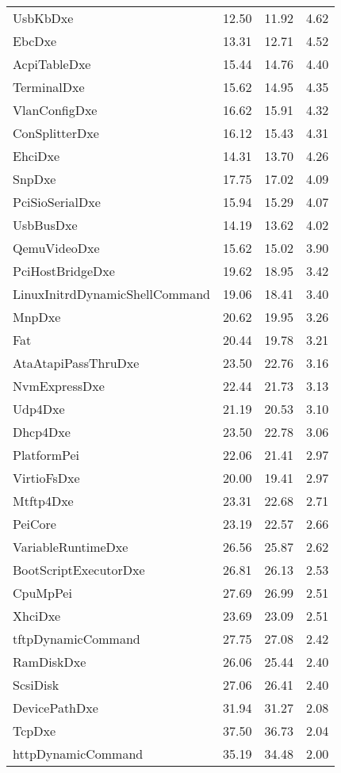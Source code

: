 \begin{longtable}{l c c c}
  UsbKbDxe & 12.50 & 11.92 & 4.62\\
  EbcDxe & 13.31 & 12.71 & 4.52\\
  AcpiTableDxe & 15.44 & 14.76 & 4.40\\
  TerminalDxe & 15.62 & 14.95 & 4.35\\
  VlanConfigDxe & 16.62 & 15.91 & 4.32\\
  ConSplitterDxe & 16.12 & 15.43 & 4.31\\
  EhciDxe & 14.31 & 13.70 & 4.26\\
  SnpDxe & 17.75 & 17.02 & 4.09\\
  PciSioSerialDxe & 15.94 & 15.29 & 4.07\\
  UsbBusDxe & 14.19 & 13.62 & 4.02\\
  QemuVideoDxe & 15.62 & 15.02 & 3.90\\
  PciHostBridgeDxe & 19.62 & 18.95 & 3.42\\
  LinuxInitrdDynamicShellCommand & 19.06 & 18.41 & 3.40\\
  MnpDxe & 20.62 & 19.95 & 3.26\\
  Fat & 20.44 & 19.78 & 3.21\\
  AtaAtapiPassThruDxe & 23.50 & 22.76 & 3.16\\
  NvmExpressDxe & 22.44 & 21.73 & 3.13\\
  Udp4Dxe & 21.19 & 20.53 & 3.10\\
  Dhcp4Dxe & 23.50 & 22.78 & 3.06\\
  PlatformPei & 22.06 & 21.41 & 2.97\\
  VirtioFsDxe & 20.00 & 19.41 & 2.97\\
  Mtftp4Dxe & 23.31 & 22.68 & 2.71\\
  PeiCore & 23.19 & 22.57 & 2.66\\
  VariableRuntimeDxe & 26.56 & 25.87 & 2.62\\
  BootScriptExecutorDxe & 26.81 & 26.13 & 2.53\\
  CpuMpPei & 27.69 & 26.99 & 2.51\\
  XhciDxe & 23.69 & 23.09 & 2.51\\
  tftpDynamicCommand & 27.75 & 27.08 & 2.42\\
  RamDiskDxe & 26.06 & 25.44 & 2.40\\
  ScsiDisk & 27.06 & 26.41 & 2.40\\
  DevicePathDxe & 31.94 & 31.27 & 2.08\\
  TcpDxe & 37.50 & 36.73 & 2.04\\
  httpDynamicCommand & 35.19 & 34.48 & 2.00\\

\end{longtable}
